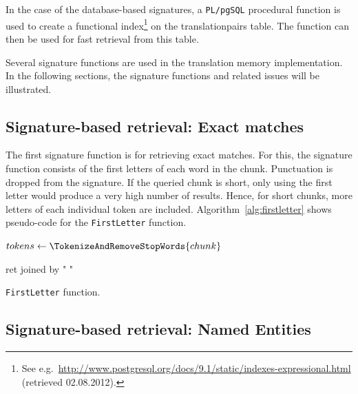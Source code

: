 In the case of the database-based signatures, a {\tt PL/pgSQL} procedural function is used to create a functional index\footnote{See e.g.\ \url{http://www.postgresql.org/docs/9.1/static/indexes-expressional.html} (retrieved 02.08.2012).} on the translationpairs table. The function can then be used for fast retrieval from this table.


Several signature functions are used in the translation memory
implementation. In the following sections, the signature functions and related issues will be illustrated.


\subsection{Signature-based retrieval: Exact matches}

The first signature function is for retrieving exact matches. For this,
the signature function consists of the first letters of each word in the
chunk. Punctuation is dropped from the signature. If the queried chunk is
short, only using the first letter would produce a very high number of
results. Hence, for short chunks, more letters of each individual token are
included. Algorithm~\ref{alg:firstletter} shows pseudo-code for the {\tt FirstLetter}
function.

\vspace{1em}
\begin{algorithm}[H]
\label{alg:firstletter}


 \SetAlgoLined

 $tokens \leftarrow \TokenizeAndRemoveStopWords{chunk}$

 \Return ret joined by " "
 \caption{{\tt FirstLetter} function.}
\end{algorithm}





\subsection{Signature-based retrieval: Named Entities}

